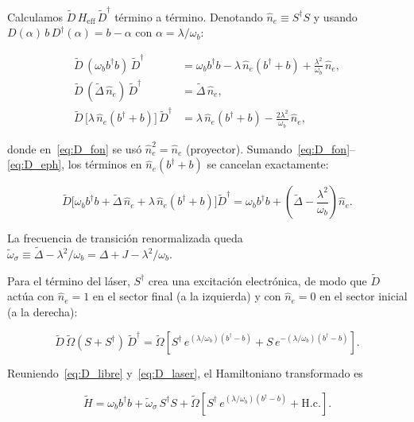Calculamos $\widetilde{D}\,H_\mathrm{eff}\,\widetilde{D}^\dagger$ término a término. Denotando $\hat{n}_e \equiv S^\dagger S$ y usando $D(\alpha)\,b\,D^\dagger(\alpha) = b - \alpha$ con $\alpha = \lambda/\omega_b$:

\begin{align}
	\widetilde{D}\,(\omega_b b^\dagger b)\,\widetilde{D}^\dagger
	&= \omega_b b^\dagger b
	- \lambda\,\hat{n}_e(b^\dagger + b)
	+ \frac{\lambda^2}{\omega_b}\,\hat{n}_e,
	\label{eq:D_fon}\\[4pt]
	\widetilde{D}\,(\widetilde\Delta\,\hat{n}_e)\,\widetilde{D}^\dagger
	&= \widetilde\Delta\,\hat{n}_e,
	\label{eq:D_elec}\\[4pt]
	\widetilde{D}\,\bigl[\lambda\,\hat{n}_e(b^\dagger+b)\bigr]\,\widetilde{D}^\dagger
	&= \lambda\,\hat{n}_e(b^\dagger+b)
	- \frac{2\lambda^2}{\omega_b}\,\hat{n}_e,
	\label{eq:D_eph}
\end{align}

donde en~\eqref{eq:D_fon} se usó $\hat{n}_e^2 = \hat{n}_e$ (proyector). Sumando~\eqref{eq:D_fon}--\eqref{eq:D_eph}, los términos en $\hat{n}_e(b^\dagger+b)$ se cancelan exactamente:

\begin{equation}
	\widetilde{D}\bigl[\omega_b b^\dagger b
	+ \widetilde\Delta\,\hat{n}_e
	+ \lambda\,\hat{n}_e(b^\dagger+b)\bigr]\widetilde{D}^\dagger
	= \omega_b b^\dagger b
	+ \left(\widetilde\Delta - \frac{\lambda^2}{\omega_b}\right)\hat{n}_e.
	\label{eq:D_libre}
\end{equation}

La frecuencia de transición renormalizada queda $\widetilde\omega_\sigma \equiv \widetilde\Delta - \lambda^2/\omega_b = \Delta + J - \lambda^2/\omega_b$.

Para el término del láser, $S^\dagger$ crea una excitación electrónica, de modo que $\widetilde{D}$ actúa con $\hat{n}_e = 1$ en el sector final (a la izquierda) y con $\hat{n}_e = 0$ en el sector inicial (a la derecha):

\begin{equation}
	\widetilde{D}\,\widetilde\Omega(S+S^\dagger)\,\widetilde{D}^\dagger
	= \widetilde\Omega\!\left[
	S^\dagger\,e^{(\lambda/\omega_b)(b^\dagger-b)}
	+ S\,e^{-(\lambda/\omega_b)(b^\dagger-b)}
	\right].
	\label{eq:D_laser}
\end{equation}

Reuniendo~\eqref{eq:D_libre} y~\eqref{eq:D_laser}, el Hamiltoniano transformado es

\begin{equation}
	\widetilde{H} = \omega_b b^\dagger b
	+ \widetilde\omega_\sigma\,S^\dagger S
	+ \widetilde\Omega\!\left[
	S^\dagger\,e^{(\lambda/\omega_b)(b^\dagger - b)}
	+ \mathrm{H.c.}
	\right].
	\label{eq:Htilde}
\end{equation}

